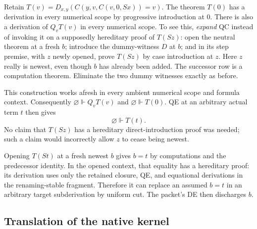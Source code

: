 Retain $T(v)=D_{x,y}(C(y,v,C(v,0,Sx))=v)$.
The theorem $T(0)$ has a derivation in every numerical scope by
progressive introduction at $0$.
There is also a derivation of $Q_vT(v)$ in every numerical scope.
To see this, \emph{expand} QC instead of invoking it on a supposedly
hereditary proof of $T(Sz)$: open the neutral theorem at a fresh $b$;
introduce the dummy-witness $D$ at $b$; and in its step premise, with
$z$ newly opened, prove $T(Sz)$ by case introduction at $z$.
Here $z$ really is newest, even though $b$ has already been added.
The successor row is a computation theorem.  Eliminate the two dummy
witnesses exactly as before.

This construction works afresh in every ambient numerical scope and
formula context.  Consequently $\varnothing\Vdash Q_vT(v)$ and
$\varnothing\Vdash T(0)$.  QE at an arbitrary actual term $t$ then
gives
\[
 \varnothing\Vdash T(t).
\]
No claim that $T(Sz)$ has a hereditary direct-introduction proof was
needed; such a claim would incorrectly allow $z$ to cease being newest.

Opening $T(St)$ at a fresh newest $b$ gives $b=t$ by computations and
the predecessor identity.  In the opened context, that equality has
a hereditary proof: its derivation uses only the retained closure,
QE, and equational derivations in the renaming-stable fragment.
Therefore it can replace an assumed $b=t$ in an arbitrary target
subderivation by uniform cut.  The packet's DE then discharges $b$.

\subsection{Translation of the native kernel}

